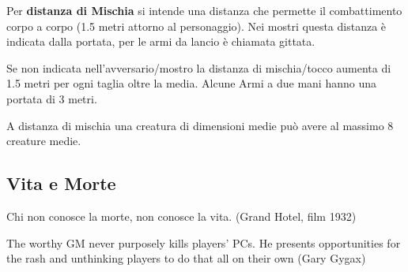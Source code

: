 \documentclass[12pt,a4paper,twoside,openany]{book}
\begin{document}
\begin{multicols}{2}
Per \textbf{distanza di Mischia}  si intende una distanza che permette il combattimento corpo a corpo (1.5 metri attorno al personaggio). Nei mostri questa distanza è indicata dalla portata, per le armi da lancio è chiamata gittata.

Se non indicata nell'avversario/mostro la distanza di mischia/tocco aumenta di 1.5 metri per ogni taglia oltre la media.
Alcune Armi a due mani hanno una portata di 3 metri.

A distanza di mischia una creatura di dimensioni medie può avere al massimo 8 creature medie.

\end{multicols}

\pagebreak

\subsection{Vita e Morte}\label{morire}

\begin{changemargin}{0.3cm}{0.3cm}\begin{enfasi}{Chi non conosce la morte, non conosce la vita. (Grand Hotel, film 1932)

\medskip

The worthy GM never purposely kills players' PCs. He presents opportunities for the rash and unthinking players to do that all on their own (Gary Gygax)}\end{enfasi}\end{changemargin}\medskip
\end{document}

